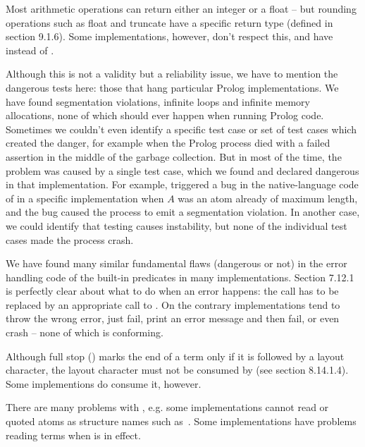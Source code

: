 \documentclass[draft]{llncs}%
\begin{document}
Most arithmetic operations can return either an integer or a float -- but
rounding operations such as \textsf{float} and \textsf{truncate} have a
specific return type (defined in section 9.1.6). Some implementations,
however, don't respect this, and have  instead of
.

Although this is not a validity but a reliability issue, we have to mention
the dangerous tests here: those that hang particular Prolog implementations.
We have found segmentation violations, infinite loops and infinite memory
allocations, none of which should ever happen when running Prolog code.
Sometimes we couldn't even identify a specific test case or set of test cases
which created the danger, for example when the Prolog process died with a
failed assertion in the middle of the garbage collection. But in most of the
time, the problem was caused by a single test case, which we found and
declared dangerous in that implementation. For example,
 triggered a bug in the native-language
code of  in a specific
implementation when $A$ was an atom already of maximum length, and the bug
caused the process to emit a segmentation violation. In another case, we
could identify that testing  causes instability, but none
of the individual test cases made the process crash.

We have found many similar fundamental flaws (dangerous or not) in the
error handling code of the built-in predicates in many implementations.
Section 7.12.1 is perfectly clear about what to do when an error happens: the
call has to be replaced by an appropriate call to .
On the contrary implementations tend to throw the wrong error, just fail,
print an error message and then fail, or even crash -- none of which is
conforming.

Although full stop ()
marks the end of a term only if it is followed by a
layout character, the layout character must not be consumed by
 (see section 8.14.1.4). Some implementions do consume it,
however.

There are many problems with , e.g. some implementations
cannot read  or quoted atoms as structure names
such as \,.
Some implementations have problems reading terms when
 is in effect.
\end{document}
